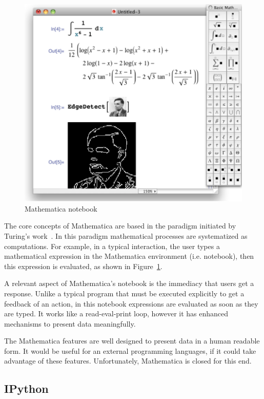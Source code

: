 \begin{figure}[!htbp]
  \centering
  \includegraphics[width=.7\textwidth]{images/mathematica}
    \caption{Mathematica notebook}  
  \label{fig:math}
\end{figure} 

The core concepts of Mathematica are based in the paradigm initiated by Turing's work~\citep{wolfram2003wolfram}. In this paradigm mathematical processes are systematized as computations. For example, in a typical interaction, the user types a mathematical expression in the Mathematica environment (i.e. notebook), then this expression is evaluated, as shown in Figure~\ref{fig:math}.  

A relevant aspect of Mathematica's notebook is the immediacy that users get a response. Unlike a typical program that must be executed explicitly to get a feedback of an action, in this notebook expressions are evaluated as soon as they are typed. It works like a read-eval-print loop, however it has enhanced mechanisms to present data meaningfully.

The Mathematica features are well designed to present data in a human readable form. It would be useful for an external programming languages, if it could take advantage of these features. Unfortunately, Mathematica is closed for this end.
\subsection{IPython}
\label{subsec:ipython}


